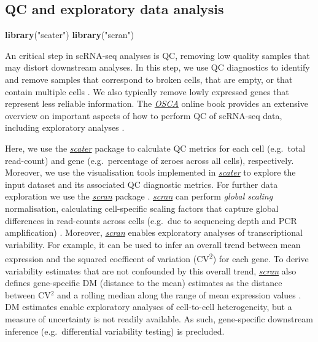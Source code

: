 \documentclass[9pt,a4paper,]{extarticle}
\newenvironment{Shaded}{\begin{snugshade}}{\end{snugshade}}
\newcommand{\KeywordTok}[1]{\textcolor[rgb]{0.13,0.29,0.53}{\textbf{#1}}}
\newcommand{\NormalTok}[1]{#1}
\newcommand{\StringTok}[1]{\textcolor[rgb]{0.31,0.60,0.02}{#1}}
\begin{document}
\hypertarget{qc-and-exploratory-data-analysis}{%
\subsection{QC and exploratory data analysis}\label{qc-and-exploratory-data-analysis}}

\begin{Shaded}
\begin{Highlighting}[]
\KeywordTok{library}\NormalTok{(}\StringTok{"scater"}\NormalTok{)}
\KeywordTok{library}\NormalTok{(}\StringTok{"scran"}\NormalTok{)}
\end{Highlighting}
\end{Shaded}

An critical step in scRNA-seq analyses is QC, removing low quality samples that
may distort downstream analyses.
In this step, we use QC diagnostics to identify and remove samples that
correspond to broken cells, that are empty, or that contain multiple cells
\citep{Ilicic2016}. We also typically remove lowly expressed genes that represent
less reliable information.
The \href{https://osca.bioconductor.org/}{\emph{OSCA}} online book provides an extensive
overview on important aspects of how to perform QC of scRNA-seq data, including
exploratory analyses \citep{Amezquita2019}.

Here, we use the \emph{\href{https://bioconductor.org/packages/3.11/scater}{scater}} package \citep{McCarthy2017} to calculate
QC metrics for each cell (e.g.~total read-count) and gene (e.g.~percentage of
zeroes across all cells), respectively.
Moreover, we use the visualisation tools implemented in \emph{\href{https://bioconductor.org/packages/3.11/scater}{scater}} to
explore the input dataset and its associated QC diagnostic metrics.
For further data exploration we use the \emph{\href{https://bioconductor.org/packages/3.11/scran}{scran}} package \citep{Lun2016}.
\emph{\href{https://bioconductor.org/packages/3.11/scran}{scran}} can perform \emph{global scaling} normalisation, calculating
cell-specific scaling factors that capture global differences in read-counts
across cells (e.g.~due to sequencing depth and PCR amplification)
\citep{Lun2016pooling}.
Moreover, \emph{\href{https://bioconductor.org/packages/3.11/scran}{scran}} enables exploratory analyses of transcriptional
variability.
For example, it can be used to infer an overall trend between mean expression
and the squared coefficent of variation (CV\textsuperscript{2}) for each gene.
To derive variability estimates that are not confounded by this overall trend,
\emph{\href{https://bioconductor.org/packages/3.11/scran}{scran}} also defines gene-specific DM (distance to the mean)
estimates as the distance between CV\(^2\) and a rolling median along the range
of mean expression values \citep{Kolodziejczyk2015cell}.
DM estimates enable exploratory analyses of cell-to-cell heterogeneity, but a
measure of uncertainty is not readily available. As such, gene-specific
downstream inference (e.g.~differential variability testing) is precluded.
\end{document}
